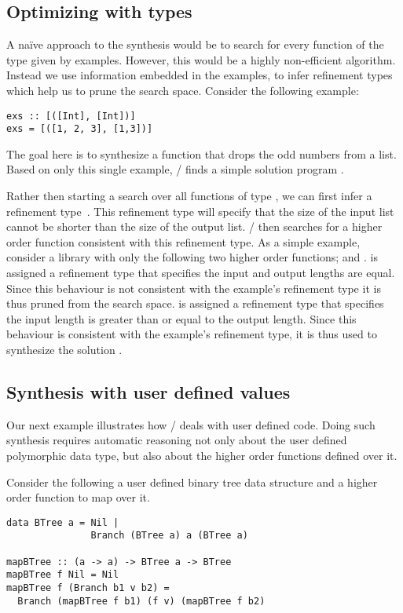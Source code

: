 \subsection{Optimizing with types}
\label{sec:exampleFilter}

A na\"ive approach to the synthesis would be to search 
for every function of the type given by examples. However, this would be
a highly non-efficient algorithm.
Instead we use information embedded in the examples, to infer refinement types which help us to prune the search space.
Consider the following example:
\begin{lstlisting}
exs :: [([Int], [Int])]
exs = [([1, 2, 3], [1,3])]
\end{lstlisting}
The goal here is to synthesize a function that drops the odd numbers from a list. Based on only this single example, \ourTool/ finds a simple solution program .

Rather then starting a search over all functions of type \codeinline{[Int] -> [Int]}, we can first infer a refinement 
type~\cite{DBLP:conf/icfp/VazouSJVJ14}.
This refinement type will specify that the size of the input list cannot be shorter than the size of the output list.
\ourTool/ then searches for a higher order function consistent with this refinement type.
As a simple example, consider a library with only the following two higher order functions;  and .
 is assigned a refinement type that specifies the input and output lengths are equal.
Since this behaviour is not consistent with the example's refinement type it is thus pruned from the search space.
 is assigned a refinement type that specifies the input length is greater than or equal to the output length.
Since this behaviour is consistent with the example's refinement type, it is thus used to synthesize the solution .


\subsection{Synthesis with user defined values}
\label{sec:exampleBTree}

Our next example illustrates how \ourTool/ deals with user defined code. 
Doing such synthesis requires automatic reasoning not only about the user defined polymorphic data type, but also about the higher order functions defined over it.

Consider the following a user defined binary tree data structure and a higher order function to map over it.
\begin{lstlisting}
data BTree a = Nil |
               Branch (BTree a) a (BTree a)

mapBTree :: (a -> a) -> BTree a -> BTree 
mapBTree f Nil = Nil
mapBTree f (Branch b1 v b2) = 
  Branch (mapBTree f b1) (f v) (mapBTree f b2)
\end{lstlisting}

